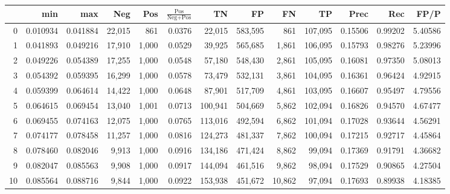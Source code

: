 \begin{tabular}{rrrrrrrrrrrrr}
\toprule
{} &       min &       max &     Neg &    Pos & $\frac{\text{Pos}}{\text{Neg}+\text{Pos}}$ &       TN &       FP &       FN &       TP &     Prec &      Rec &     FP/P \\
\midrule
0   &  0.010934 &  0.041884 &  22,015 &    861 &                                     0.0376 &   22,015 &  583,595 &      861 &  107,095 &  0.15506 &  0.99202 &  5.40586 \\
1   &  0.041893 &  0.049216 &  17,910 &  1,000 &                                     0.0529 &   39,925 &  565,685 &    1,861 &  106,095 &  0.15793 &  0.98276 &  5.23996 \\
2   &  0.049226 &  0.054389 &  17,255 &  1,000 &                                     0.0548 &   57,180 &  548,430 &    2,861 &  105,095 &  0.16081 &  0.97350 &  5.08013 \\
3   &  0.054392 &  0.059395 &  16,299 &  1,000 &                                     0.0578 &   73,479 &  532,131 &    3,861 &  104,095 &  0.16361 &  0.96424 &  4.92915 \\
4   &  0.059399 &  0.064614 &  14,422 &  1,000 &                                     0.0648 &   87,901 &  517,709 &    4,861 &  103,095 &  0.16607 &  0.95497 &  4.79556 \\
5   &  0.064615 &  0.069454 &  13,040 &  1,001 &                                     0.0713 &  100,941 &  504,669 &    5,862 &  102,094 &  0.16826 &  0.94570 &  4.67477 \\
6   &  0.069455 &  0.074163 &  12,075 &  1,000 &                                     0.0765 &  113,016 &  492,594 &    6,862 &  101,094 &  0.17028 &  0.93644 &  4.56291 \\
7   &  0.074177 &  0.078458 &  11,257 &  1,000 &                                     0.0816 &  124,273 &  481,337 &    7,862 &  100,094 &  0.17215 &  0.92717 &  4.45864 \\
8   &  0.078460 &  0.082046 &   9,913 &  1,000 &                                     0.0916 &  134,186 &  471,424 &    8,862 &   99,094 &  0.17369 &  0.91791 &  4.36682 \\
9   &  0.082047 &  0.085563 &   9,908 &  1,000 &                                     0.0917 &  144,094 &  461,516 &    9,862 &   98,094 &  0.17529 &  0.90865 &  4.27504 \\
10  &  0.085564 &  0.088716 &   9,844 &  1,000 &                                     0.0922 &  153,938 &  451,672 &   10,862 &   97,094 &  0.17693 &  0.89938 &  4.18385 \\

\end{tabular}
